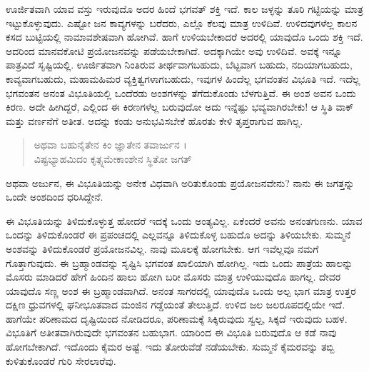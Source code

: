 ಊರ್ಜಿತವಾಗಿ ಯಾವ ವಸ್ತು ಇರುವುದೊ ಅದರ ಹಿಂದೆ ಭಗವತ್ ಶಕ್ತಿ ಇದೆ. ಕಾಲ ಜಳ್ಳನ್ನು ತೂರಿ ಗಟ್ಟಿಯನ್ನು ಮಾತ್ರ ಇಟ್ಟುಕೊಳ್ಳುವುದು. ಎಷ್ಟೋ ಜನ ಕಾವ್ಯಗಳನ್ನು ಬರೆದರು, ಎಲ್ಲೊ ಕೆಲವು ಮಾತ್ರ ಉಳಿದಿವೆ. ಉಳಿದವುಗಳೆಲ್ಲ ಕಾಲನ ಕಸದ ಬುಟ್ಟಿಯಲ್ಲಿ ನಾಮಾವಶೇಷವಾಗಿ ಹೋಗಿವೆ. ಹಾಗೆ ಉಳಿಯಬೇಕಾದರೆ ಅದರಲ್ಲಿ ಯಾವುದೊ ಒಂದು ಶಕ್ತಿ ಇದೆ. ಅದರಿಂದ ಮಾನವಕೋಟಿ ಪ್ರಯೋಜನವನ್ನು ಪಡೆಯಬೇಕಾಗಿದೆ. ಅದಕ್ಕಾಗಿಯೇ ಅವು ಉಳಿದಿವೆ. ಅವಕ್ಕೆ ಇನ್ನೂ ಪಾತ್ರವಿದೆ ಸೃಷ್ಟಿಯಲ್ಲಿ. ಊರ್ಜಿತವಾಗಿ ನಿಂತಿರುವ ತೀರ್ಥವಾಗಬಹುದು, ಬೆಟ್ಟವಾಗ ಬಹುದು, ನದಿಯಾಗಬಹುದು, ಕಾವ್ಯವಾಗಬಹುದು, ಮಹಾಮಹಿಮರ ವ್ಯಕ್ತಿತ್ವಗಳಾಗಬಹುದು, ಇವುಗಳ ಹಿಂದೆಲ್ಲ ಭಗವಂತನ ವಿಭೂತಿ ಇದೆ. ಇದೆಲ್ಲ ಭಗವಂತನ ಅನಂತ ವಿಭೂತಿಯಲ್ಲಿ ಒಂದೆರಡು ಅಂಶಗಳನ್ನು ತೆಗೆದುಕೊಂಡು ಬೆಳಗುತ್ತಿವೆ. ಈ ಅಂಶ ಅವನ ಒಂದು ಕಿರಣ. ಅದೇ ಹೀಗಿದ್ದರೆ, ಎಲ್ಲಿಂದ ಈ ಕಿರಣಗಳೆಲ್ಲ ಬರುವುದೋ ಅದು ಇನ್ನೆಷ್ಟು ಭವ್ಯವಾಗಿರಬೇಕು! ಆ ಸ್ಥಿತಿ ವಾಕ್ ಮತ್ತು ವರ್ಣನೆಗೆ ಅತೀತ. ಅದನ್ನು ಕಂಡು ಅನುಭವಿಸಬೇಕೆ ಹೊರತು ಕೇಳಿ ತೃಪ್ತರಾಗುವ ಹಾಗಿಲ್ಲ.

\begin{verse}
ಅಥವಾ ಬಹುನೈತೇನ ಕಿಂ ಜ್ಞಾತೇನ ತವಾರ್ಜುನ ।\\ವಿಷ್ಟಭ್ಯಾಹಮಿದಂ ಕೃತ್ಸ್ನಮೇಕಾಂಶೇನ ಸ್ಥಿತೋ ಜಗತ್ 
\end{verse}

{\small ಅಥವಾ ಅರ್ಜುನ, ಈ ವಿಭೂತಿಯನ್ನು ಅನೇಕ ವಿಧವಾಗಿ ಅರಿತುಕೊಂಡು ಪ್ರಯೋಜನವೇನು? ನಾನು ಈ ಜಗತ್ತನ್ನು ಒಂದೇ ಅಂಶದಿಂದ ಧರಿಸಿದ್ದೇನೆ.}

ಈ ವಿಭೂತಿಯನ್ನು ತಿಳಿದುಕೊಳ್ಳುತ್ತ ಹೋದರೆ ಇದಕ್ಕೆ ಒಂದು ಅಂತ್ಯವಿಲ್ಲ. ಏಕೆಂದರೆ ಅವನು ಅನಂತಗುಣನು. ಯಾವ ಒಂದನ್ನು ತಿಳಿದುಕೊಂಡರೆ ಈ ಪ್ರಪಂಚದಲ್ಲಿ ಎಲ್ಲವನ್ನೂ ತಿಳಿದುಕೊಳ್ಳ ಬಹುದೊ ಅದನ್ನು ತಿಳಿಯಬೇಕು. ಸುಮ್ಮನೆ ಅಂಶವನ್ನು ತಿಳಿದುಕೊಂಡರೆ ಪ್ರಯೋಜನವಿಲ್ಲ. ನಾವು ಮೂಲಕ್ಕೆ ಹೋಗಬೇಕು. ಆಗ ಇವೆಲ್ಲವೂ ನಮಗೆ ಗೊತ್ತಾಗುವುದು. ಈ ಬ್ರಹ್ಮಾಂಡವನ್ನು ಸೃಷ್ಟಿಸಿ ಭಗವಂತ ಖಾಲಿಯಾಗಿ ಹೋಗಿಲ್ಲ. ಇದು ಒಂದು ಪಾತ್ರೆಯ ಹಾಲನ್ನು ಮೊಸರು ಮಾಡಿದರೆ ಹೇಗೆ ಹಿಂದಿನ ಹಾಲು ಹೋಗಿ ಬರೀ ಮೊಸರು ಮಾತ್ರ ಉಳಿಯುವುದೊ ಹಾಗಲ್ಲ. ದೇವರ ಯಾವುದೊ ಸಣ್ಣ ಅಂಶ ಈ ಬ್ರಹ್ಮಾಂಡವಾಗಿದೆ. ಅನಂತ ಸಾಗರದಲ್ಲಿ ಯಾವುದೊ ಒಂದು ಅಲ್ಪ ಭಾಗ ಮಾತ್ರ ಉತ್ತರ ದಕ್ಷಿಣ ಧ್ರುವಗಳಲ್ಲಿ ಘನೀಭೂತವಾದ ಮಂಜಿನ ಗಡ್ಡೆಯಂತೆ ತೇಲುತ್ತಿದೆ. ಉಳಿದ ಜಲ ಜಲರೂಪದಲ್ಲಿಯೇ ಇದೆ. ಹಾಗೆಯೇ ಪರಿಣಾಮದ ದೃಷ್ಟಿಯಿಂದ ನೋಡಿದರೂ, ಪರಿಣಾಮಕ್ಕೆ ಸಿಕ್ಕಿರುವುದು ಸ್ವಲ್ಪ, ಸಿಕ್ಕದೆ ಇರುವುದು ಬಹಳ. ವಿಭೂತಿಗೆ ಅತೀತವಾಗಿರುವುದೇ ಭಗವಂತನ ಬಹುಭಾಗ. ಯಾರಿಂದ ಈ ವಿಭೂತಿ ಬರುವುದೊ ಆ ಕಡೆ ನಾವು ಹೋಗಬೇಕಾಗಿದೆ. ಇದೊಂದು ಕೈಮರ ಅಷ್ಟೆ. ಇದು ತೋರುವೆಡೆ ನಡೆಯಬೇಕು. ಸುಮ್ಮನೆ ಕೈಮರವನ್ನು ತಬ್ಬಿ ಕುಳಿತುಕೊಂಡರೆ ಗುರಿ ಸೇರಲಾರೆವು.

